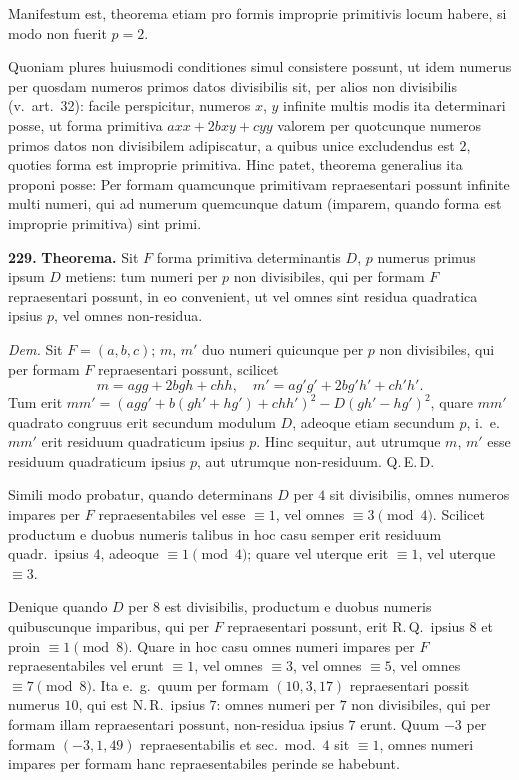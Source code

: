\documentclass[12pt,a4paper]{article}
\theoremstyle{plain}
\theoremstyle{definition}
\theoremstyle{remark}
\begin{document}
Manifestum est, theorema etiam pro formis improprie primitivis locum habere, si modo non fuerit $p=2$.

Quoniam plures huiusmodi conditiones simul consistere possunt, ut idem numerus per quosdam numeros primos datos divisibilis sit, per alios non divisibilis (v.\ art.\ 32): facile perspicitur, numeros $x$, $y$ infinite multis modis ita determinari posse, ut forma primitiva $axx+2bxy+cyy$ valorem per quotcunque numeros primos datos non divisibilem adipiscatur, a quibus unice excludendus est $2$, quoties forma est improprie primitiva. Hinc patet, theorema generalius ita proponi posse: Per formam quamcunque primitivam repraesentari possunt infinite multi numeri, qui ad numerum quemcunque datum (imparem, quando forma est improprie primitiva) sint primi.

\textbf{229.}
\textbf{Theorema.}
Sit $F$ forma primitiva determinantis $D$, $p$ numerus primus ipsum $D$ metiens: tum numeri per $p$ non divisibiles, qui per formam $F$ repraesentari possunt, in eo convenient, ut vel omnes sint residua quadratica ipsius $p$, vel omnes non-residua.

\textit{Dem.}
Sit $F=(a,b,c)$; $m$, $m'$ duo numeri quicunque per $p$ non divisibiles, qui per formam $F$ repraesentari possunt, scilicet
\[
m=a gg+2bgh+chh,\quad m'=a g'g'+2bg'h'+ch'h'.
\]
Tum erit $mm'=(agg'+b(gh'+hg')+chh')^2-D(gh'-hg')^2$, quare $mm'$ quadrato congruus erit secundum modulum $D$, adeoque etiam secundum $p$, i.\ e.\ $mm'$ erit residuum quadraticum ipsius $p$. Hinc sequitur, aut utrumque $m$, $m'$ esse residuum quadraticum ipsius $p$, aut utrumque non-residuum. Q.\,E.\,D.

Simili modo probatur, quando determinans $D$ per $4$ sit divisibilis, omnes numeros impares per $F$ repraesentabiles vel esse $\equiv 1$, vel omnes $\equiv 3\pmod{4}$. Scilicet productum e duobus numeris talibus in hoc casu semper erit residuum quadr.\ ipsius $4$, adeoque $\equiv 1\pmod{4}$; quare vel uterque erit $\equiv 1$, vel uterque $\equiv 3$.

Denique quando $D$ per $8$ est divisibilis, productum e duobus numeris quibuscunque imparibus, qui per $F$ repraesentari possunt, erit R.\,Q.\ ipsius $8$ et proin $\equiv 1\pmod{8}$. Quare in hoc casu omnes numeri impares per $F$ repraesentabiles vel erunt $\equiv 1$, vel omnes $\equiv 3$, vel omnes $\equiv 5$, vel omnes $\equiv 7\pmod{8}$. Ita e.\ g.\ quum per formam $(10,3,17)$ repraesentari possit numerus $10$, qui est N.\,R.\ ipsius $7$: omnes numeri per $7$ non divisibiles, qui per formam illam repraesentari possunt, non-residua ipsius $7$ erunt. Quum $-3$ per formam $(-3,1,49)$ repraesentabilis et sec.\ mod.\ $4$ sit $\equiv 1$, omnes numeri impares per formam hanc repraesentabiles perinde se habebunt.
\end{document}
